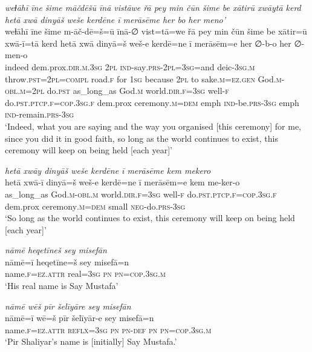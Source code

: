 \ea \label{ZP.128}
\textit{weɫāhī īne šime māčdēšū īnā vistāwe řā pey min čūn šime be xātirū xwāytā kerd hetā xwā dinyāš weše kerdēne ī merāsēme her bo her meno’} \\ 
\gll weɫāhī īne šime m-āč-dē=š=ū īnā-∅ vist=tā=we řā pey min čūn šime be xātir=ū xwā-ī=tā kerd hetā xwā dinyā=š weš-e kerdē=ne ī merāsēm=e her ∅-b-o her ∅-men-o \\ 
 indeed dem.prox\textsc{.dir}\textsc{.m}\textsc{.3sg} \textsc{2pl} \textsc{ind-}say\textsc{.prs}-\textsc{2pl}\textsc{=3sg}=and deic\textsc{-3sg}\textsc{.m} throw\textsc{.pst}=\textsc{2pl}\textsc{=compl} road\textsc{.f} for \textsc{1sg} because \textsc{2pl} to sake\textsc{.m}\textsc{\textsc{=ez.gen}} God\textsc{.m}\textsc{-obl}\textsc{.m}=\textsc{2pl} do\textsc{.pst} as\_long\_as God\textsc{.m} world\textsc{.dir}\textsc{.f}\textsc{=3sg} well\textsc{-f} do\textsc{.pst}\textsc{.ptcp}\textsc{.f}\textsc{=cop}\textsc{.3sg}\textsc{.f} dem.prox ceremony\textsc{.m}\textsc{=dem} emph \textsc{ind-}be\textsc{.prs}\textsc{-3sg} emph \textsc{ind-}remain\textsc{.prs}\textsc{-3sg} \\ 
\glt `Indeed, what you are saying and the way you organised [this ceremony] for me, since you did it in good faith, so long as the world continues to exist, this ceremony will keep on being held [each year]'
\z 
 
\ea \label{ZP.130}
\textit{hetā xwāy dinyāš weše kerdēne ī merāsēme kem mekero} \\ 
\gll hetā xwā-ī dinyā=š weš-e kerdē=ne ī merāsēm=e kem me-ker-o \\ 
 as\_long\_as God\textsc{.m}\textsc{-obl}\textsc{.m} world\textsc{.dir}\textsc{.f}\textsc{=3sg} well\textsc{-f} do\textsc{.pst}\textsc{.ptcp}\textsc{.f}\textsc{=cop}\textsc{.3sg}\textsc{.f} dem.prox ceremony\textsc{.m}\textsc{=dem} small \textsc{neg-}do\textsc{.prs}\textsc{-3sg} \\ 
\glt `So long as the world continues to exist, this ceremony will keep on being held [each year]'
\z 
 
\ea \label{ŽP.1}
\textit{nāmē heqetīneš sey misefān} \\ 
\gll nāmē=ī heqetīne=š sey misefā=n \\ 
 name\textsc{.f}\textsc{=ez}.\textsc{attr} real\textsc{=3sg} \textsc{pn} \textsc{pn}\textsc{=cop}\textsc{.3sg}\textsc{.m} \\ 
\glt `His real name is Say Mustafa'
\z 
 
\ea \label{ŽP.2}
\textit{nāmē wēš pīr šelīyāre sey misefān} \\ 
\gll nāmē=ī wē=š pīr šelīyār-e sey misefā=n \\ 
 name\textsc{.f}\textsc{=ez}.\textsc{attr} \textsc{reflx}\textsc{=3sg} \textsc{pn} \textsc{pn}\textsc{-def} \textsc{pn} \textsc{pn}\textsc{=cop}\textsc{.3sg}\textsc{.m} \\ 
\glt `Pir Shaliyar’s name is [initially] Say Mustafa.'
\z 
 
